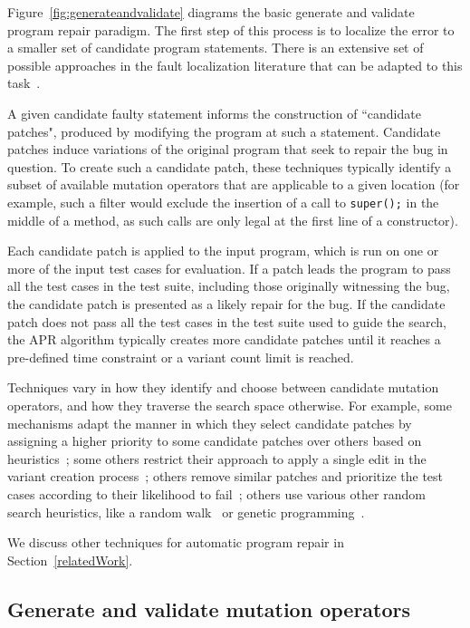 \documentclass[conference]{IEEEtran}
\begin{document}
Figure~\ref{fig:generateandvalidate} diagrams the basic generate and validate
program repair paradigm. The first step of this process is to localize the error to a smaller set of
candidate program statements. There is an extensive set of possible approaches
in the fault localization literature that can be adapted to this
task~\cite{Jones05,Jones02,Chen02,Qi2013}.  

A given candidate faulty statement informs
the construction of 
``candidate patches", produced by modifying the program at such a
statement. Candidate patches induce variations of the original program 
that seek to repair the bug in question. To 
create such a candidate patch, these techniques typically identify a subset of
available mutation operators that are applicable to a given location (for
example, such a filter would exclude the insertion of a call to
\texttt{super();} in the middle of a method, as such calls are only legal at the
first line of a constructor). 

Each candidate patch is applied to the input program, which is run on
one or more of the input test cases for evaluation.  If a patch leads the
program to 
pass all the test cases in the test suite, including those originally witnessing
the bug, the candidate patch is presented as a likely repair for the bug. 
If the candidate patch does not pass all the test cases in 
the test suite used to guide the search, the APR
algorithm typically creates more candidate patches 
until it reaches a pre-defined time constraint or a variant count limit is reached. 

Techniques vary in how they identify and choose between candidate mutation
operators, and how they traverse the search space otherwise. For example, some
mechanisms adapt the manner in which they select candidate patches by assigning
a higher priority to some candidate patches over others based on heuristics~\cite{long16proph};
some others restrict their approach to apply a single edit in the variant
creation process~\cite{Qi13TrpAutoR}; others remove similar patches and prioritize the test cases
according to their likelihood to fail~\cite{Weimer13}; others use various other
random search heuristics, like a random walk~\cite{debroy10} or genetic
programming~\cite{kim2013,legoues12}. 

We discuss other techniques for automatic program repair in
Section~\ref{relatedWork}.

\subsection{Generate and validate mutation operators} 
\label{categorization}
\end{document}
